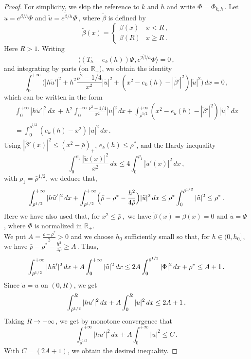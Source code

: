 \documentclass[11pt]{amsart}
\numberwithin{equation}{section}
\theoremstyle{remark}
\newcommand{\R}{\mathbb{R}}
\begin{document}
\begin{proof}
For simplicity, we skip the reference to $k$ and $h$ and write $\Phi=\Phi_{k,h}\,$. Let $ u=e^{ \beta/h}\Phi$ and $\tilde u=e^{\tilde \beta/h}\Phi\,$, where $\tilde \beta$ is defined by
\[ \tilde \beta(x)=\begin{cases}
    \beta(x)&x< R\,,\\
    \beta(R)&x\geq R\,.
\end{cases}\]
%
Here $R>1$. Writing
    \[\langle (T_h-e_k(h))\Phi,e^{2\tilde \beta/h}\Phi\rangle=0\,,\]
    and integrating by parts (on $\mathbb R_+$), we obtain the identity
    \[\int_0^{+\infty}\Big( |h \tilde u '|^2 +h^2\frac{\nu^2-1/4}{x^2}| \tilde u|^2+(x^2-e_k(h)-|\tilde \beta'|^2)| \tilde u|^2\Bigr)\,dx=0\,,\]
    which can be written in the form
     \[
     \begin{aligned}
     \int_0^{+\infty} |h \tilde u'|^2\,dx\, +\, h^2\int_{0}^{+\infty} \frac{\nu^2-1/4}{x^2}|\tilde u|^2\,dx +  \int_{\bar \rho^{1/2}}^{+\infty}(x^2-e_k(h)-|\tilde \beta'|^2)| \tilde u|^2\,dx\\ 
     =  \int_{0}^{\bar \rho^{1/2}} (e_k(h)-x^2)\, | \tilde u|^2\,dx \,.
     \end{aligned}
     \]
    Using $|\tilde\beta'(x)|^2\leq (x^2-\bar\rho)_+$, $e_k(h)\leq\rho^*$, and the Hardy inequality
    \[\int_0^{\rho_1} \frac{|\tilde u(x)|^2}{x^2}\,dx\leq 4\int_0^{\rho_1}| \tilde u'(x)|^2\,dx\,,\]
 with $\rho_1=\bar\rho^{1/2}$, we deduce that,
 \[\int_{\bar\rho^{1/2}}^{+\infty}|h  \tilde u'|^2\,dx
    +\int_{\bar\rho^{1/2}}^{+\infty}\Bigl(\bar\rho-\rho^*-\frac{h^2}{4\bar\rho}\Bigr)|\tilde u|^2\,dx
    \leq \rho^*\int_{0}^{\bar\rho^{1/2}}|\tilde u|^2\leq \rho^*\,.\] 
Here we have also used that,  
for $x^2\leq \bar\rho\,,$ we have $\tilde\beta(x)=\beta(x)=0$ and $\tilde u=\Phi$, where $\Phi$ is normalized in  $\R_+$.\\

 We put $A=\frac{\bar\rho-\rho^*}{2}>0$ and we choose $h_0$ sufficiently small so that, for $h\in(0,h_0]\,$, we have  $\bar\rho-\rho^*-\frac{h^2}{4\bar\rho}\geq A\,$. Thus, 
    \[\int_{\bar\rho^{1/2}}^{+\infty} |h \tilde u'|^2\,dx
    +A\int_{0}^{+\infty}| \tilde u|^2\,dx\\
    \leq  2 A\int_0^{\bar\rho^{1/2}}|\Phi|^2\,dx+\rho^*\leq A+1
  \,.\] 
 Since $\tilde u=u$ on $(0,R)$, we get
     \[\int_{\bar\rho^{1/2}}^{R} |h  u'|^2\,dx
    +A\int_{0}^{R}|u|^2\,dx\\
    \leq 2A+1
  \,.\]
  Taking $R\to+\infty\,$, we get by monotone convergence that
    \[\int_{\bar\rho^{1/2}}^{+\infty}|{ hu'}|^2\,dx
    +A\int_0^{+\infty}|u|^2\leq C\,.\] With $C= (2A+1)$, we obtain the desired inequality.
\end{proof}
%
\end{document}
